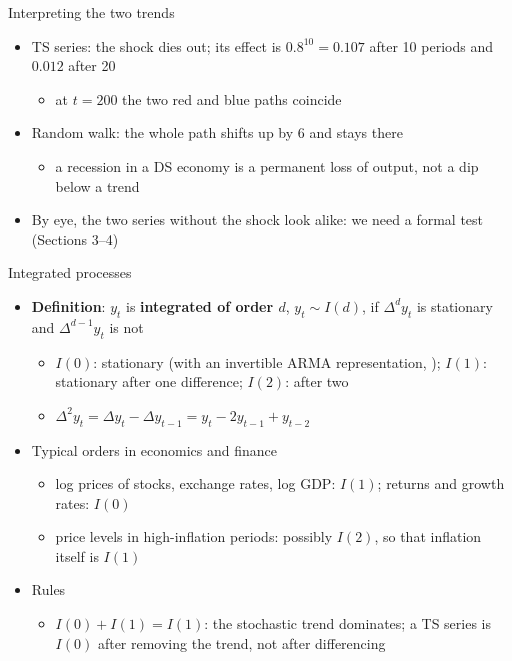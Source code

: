 \begin{frame}{Interpreting the two trends}
\itemsize{\small}
\begin{itemize}
    \item TS series: the shock dies out; its effect is $0.8^{10} = 0.107$ after 10 periods and $0.012$ after 20
    \begin{itemize}
        \item at $t = 200$ the two red and blue paths coincide
    \end{itemize}
    \item Random walk: the whole path shifts up by 6 and stays there
    \begin{itemize}
        \item a recession in a DS economy is a permanent loss of output, not a dip below a trend
    \end{itemize}
    \item By eye, the two series without the shock look alike: we need a formal test (Sections 3--4)
\end{itemize}
\end{frame}

\begin{frame}{Integrated processes}
\itemsize{\small}
\begin{itemize}
    \item \textbf{Definition}: $y_t$ is \textbf{integrated of order $d$}, $y_t \sim I(d)$, if $\Delta^d y_t$ is stationary and $\Delta^{d-1}y_t$ is not
    \begin{itemize}
        \item $I(0)$: stationary (with an invertible ARMA representation, ); $I(1)$: stationary after one difference; $I(2)$: after two
        \item $\Delta^2 y_t = \Delta y_t - \Delta y_{t-1} = y_t - 2y_{t-1} + y_{t-2}$
    \end{itemize}
    \item Typical orders in economics and finance
    \begin{itemize}
        \item log prices of stocks, exchange rates, log GDP: $I(1)$; returns and growth rates: $I(0)$
        \item price levels in high-inflation periods: possibly $I(2)$, so that inflation itself is $I(1)$
    \end{itemize}
    \item Rules
    \begin{itemize}
        \item $I(0) + I(1) = I(1)$: the stochastic trend dominates; a TS series is $I(0)$ after removing the trend, not after differencing
    \end{itemize}
\end{itemize}
\end{frame}

